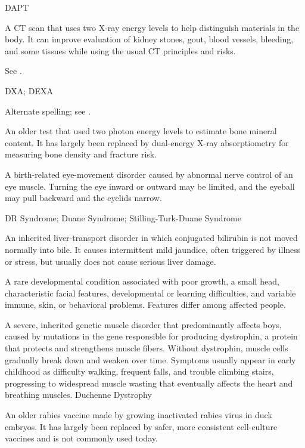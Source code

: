 \synonyms
DAPT

 A CT scan that uses two X-ray energy levels to help distinguish materials in the body. It can improve evaluation of kidney stones, gout, blood vessels, bleeding, and some tissues while using the usual CT principles and risks.

 See .

\synonyms
DXA; DEXA

 Alternate spelling; see .

 An older test that used two photon energy levels to estimate bone mineral content. It has largely been replaced by dual-energy X-ray absorptiometry for measuring bone density and fracture risk.

 A birth-related eye-movement disorder caused by abnormal nerve control of an eye muscle. Turning the eye inward or outward may be limited, and the eyeball may pull backward and the eyelids narrow.

\synonyms
DR Syndrome; Duane Syndrome; Stilling-Turk-Duane Syndrome

 An inherited liver-transport disorder in which conjugated bilirubin is not moved normally into bile. It causes intermittent mild jaundice, often triggered by illness or stress, but usually does not cause serious liver damage.

 A rare developmental condition associated with poor growth, a small head, characteristic facial features, developmental or learning difficulties, and variable immune, skin, or behavioral problems. Features differ among affected people.

 A severe, inherited genetic muscle disorder that predominantly affects boys, caused by mutations in the gene responsible for producing dystrophin, a protein that protects and strengthens muscle fibers. Without dystrophin, muscle cells gradually break down and weaken over time. Symptoms usually appear in early childhood as difficulty walking, frequent falls, and trouble climbing stairs, progressing to widespread muscle wasting that eventually affects the heart and breathing muscles.
\synonyms
Duchenne Dystrophy

 An older rabies vaccine made by growing inactivated rabies virus in duck embryos. It has largely been replaced by safer, more consistent cell-culture vaccines and is not commonly used today.

